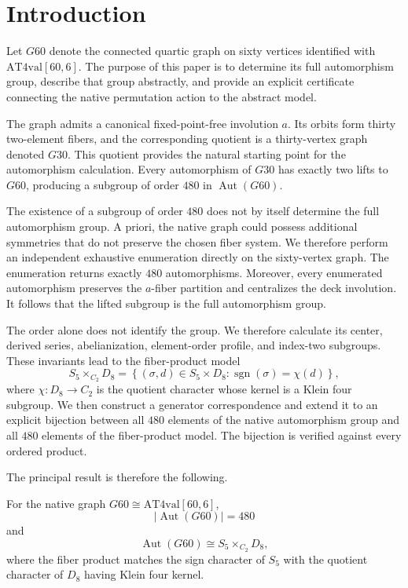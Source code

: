 \section{Introduction}

Let $G60$ denote the connected quartic graph on sixty vertices identified
with $\mathrm{AT4val}[60,6]$. The purpose of this paper is to determine
its full automorphism group, describe that group abstractly, and provide
an explicit certificate connecting the native permutation action to the
abstract model.

The graph admits a canonical fixed-point-free involution $a$. Its orbits
form thirty two-element fibers, and the corresponding quotient is a
thirty-vertex graph denoted $G30$. This quotient provides the natural
starting point for the automorphism calculation. Every automorphism of
$G30$ has exactly two lifts to $G60$, producing a subgroup of order
$480$ in $\operatorname{Aut}(G60)$.

The existence of a subgroup of order $480$ does not by itself determine
the full automorphism group. A priori, the native graph could possess
additional symmetries that do not preserve the chosen fiber system. We
therefore perform an independent exhaustive enumeration directly on the
sixty-vertex graph. The enumeration returns exactly $480$
automorphisms. Moreover, every enumerated automorphism preserves the
$a$-fiber partition and centralizes the deck involution. It follows that
the lifted subgroup is the full automorphism group.

The order alone does not identify the group. We therefore calculate its
center, derived series, abelianization, element-order profile, and
index-two subgroups. These invariants lead to the fiber-product model
\[
S_5 \times_{C_2} D_8
=
\left\{
(\sigma,d)\in S_5\times D_8:
\operatorname{sgn}(\sigma)=\chi(d)
\right\},
\]
where $\chi\colon D_8\to C_2$ is the quotient character whose kernel is
a Klein four subgroup. We then construct a generator correspondence and
extend it to an explicit bijection between all $480$ elements of the
native automorphism group and all $480$ elements of the fiber-product
model. The bijection is verified against every ordered product.

The principal result is therefore the following.

\begin{theorem}
For the native graph $G60\cong \mathrm{AT4val}[60,6]$,
\[
\left|\operatorname{Aut}(G60)\right|=480
\]
and
\[
\operatorname{Aut}(G60)
\cong
S_5\times_{C_2}D_8,
\]
where the fiber product matches the sign character of $S_5$ with the
quotient character of $D_8$ having Klein four kernel.
\end{theorem}

